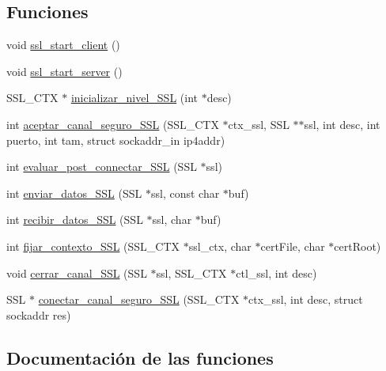 \subsection*{Funciones}
\begin{DoxyCompactItemize}
\item 
void \hyperlink{G-2313-06-P3__ssl_8c_a0fc205ff57c9c0a489d8154f94cd2f4a}{ssl\+\_\+start\+\_\+client} ()
\item 
void \hyperlink{G-2313-06-P3__ssl_8c_a6dcf2890813db3e4f8f2f423716d4883}{ssl\+\_\+start\+\_\+server} ()
\item 
S\+S\+L\+\_\+\+C\+TX $\ast$ \hyperlink{G-2313-06-P3__ssl_8c_a32d6d68d1f64d25effa1ea5ec1e6bdb3}{inicializar\+\_\+nivel\+\_\+\+S\+SL} (int $\ast$desc)
\item 
int \hyperlink{G-2313-06-P3__ssl_8c_a44410967ff9e0a1b4219c85f0e62e926}{aceptar\+\_\+canal\+\_\+seguro\+\_\+\+S\+SL} (S\+S\+L\+\_\+\+C\+TX $\ast$ctx\+\_\+ssl, S\+SL $\ast$$\ast$ssl, int desc, int puerto, int tam, struct sockaddr\+\_\+in ip4addr)
\item 
int \hyperlink{G-2313-06-P3__ssl_8c_ac5f32cf09e3c0efd5cbc25452ed192a9}{evaluar\+\_\+post\+\_\+connectar\+\_\+\+S\+SL} (S\+SL $\ast$ssl)
\item 
int \hyperlink{G-2313-06-P3__ssl_8c_adf9cb4f6b9c27081fcf12a942db1b288}{enviar\+\_\+datos\+\_\+\+S\+SL} (S\+SL $\ast$ssl, const char $\ast$buf)
\item 
int \hyperlink{G-2313-06-P3__ssl_8c_af7dca116c6dbb68e9609293102c208c5}{recibir\+\_\+datos\+\_\+\+S\+SL} (S\+SL $\ast$ssl, char $\ast$buf)
\item 
int \hyperlink{G-2313-06-P3__ssl_8c_a006acb44fc7dae799271a48117f5a398}{fijar\+\_\+contexto\+\_\+\+S\+SL} (S\+S\+L\+\_\+\+C\+TX $\ast$ssl\+\_\+ctx, char $\ast$cert\+File, char $\ast$cert\+Root)
\item 
void \hyperlink{G-2313-06-P3__ssl_8c_a307ee105b4b24b555d8df68603c2deff}{cerrar\+\_\+canal\+\_\+\+S\+SL} (S\+SL $\ast$ssl, S\+S\+L\+\_\+\+C\+TX $\ast$ctl\+\_\+ssl, int desc)
\item 
S\+SL $\ast$ \hyperlink{G-2313-06-P3__ssl_8c_aa58ddc931cb106d430ab49223b9394fc}{conectar\+\_\+canal\+\_\+seguro\+\_\+\+S\+SL} (S\+S\+L\+\_\+\+C\+TX $\ast$ctx\+\_\+ssl, int desc, struct sockaddr res)
\end{DoxyCompactItemize}


\subsection{Documentación de las funciones}
